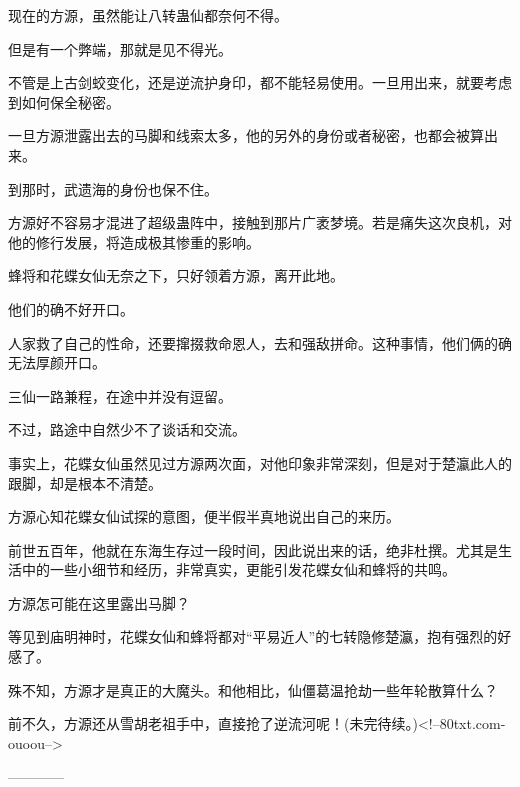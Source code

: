 \begin{this_body}
现在的方源，虽然能让八转蛊仙都奈何不得。

但是有一个弊端，那就是见不得光。

不管是上古剑蛟变化，还是逆流护身印，都不能轻易使用。一旦用出来，就要考虑到如何保全秘密。

一旦方源泄露出去的马脚和线索太多，他的另外的身份或者秘密，也都会被算出来。

到那时，武遗海的身份也保不住。

方源好不容易才混进了超级蛊阵中，接触到那片广袤梦境。若是痛失这次良机，对他的修行发展，将造成极其惨重的影响。

蜂将和花蝶女仙无奈之下，只好领着方源，离开此地。

他们的确不好开口。

人家救了自己的性命，还要撺掇救命恩人，去和强敌拼命。这种事情，他们俩的确无法厚颜开口。

三仙一路兼程，在途中并没有逗留。

不过，路途中自然少不了谈话和交流。

事实上，花蝶女仙虽然见过方源两次面，对他印象非常深刻，但是对于楚瀛此人的跟脚，却是根本不清楚。

方源心知花蝶女仙试探的意图，便半假半真地说出自己的来历。

前世五百年，他就在东海生存过一段时间，因此说出来的话，绝非杜撰。尤其是生活中的一些小细节和经历，非常真实，更能引发花蝶女仙和蜂将的共鸣。

方源怎可能在这里露出马脚？

等见到庙明神时，花蝶女仙和蜂将都对“平易近人”的七转隐修楚瀛，抱有强烈的好感了。

殊不知，方源才是真正的大魔头。和他相比，仙僵葛温抢劫一些年轮散算什么？

前不久，方源还从雪胡老祖手中，直接抢了逆流河呢！(未完待续。)<!--80txt.com-ouoou-->

------------

\end{this_body}

